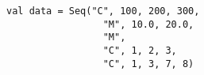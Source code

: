 \begin{lstlisting}[style=reclojureScala]
val data = Seq("C", 100, 200, 300,
                 "M", 10.0, 20.0,
                 "M",
                 "C", 1, 2, 3,
                 "C", 1, 3, 7, 8)
\end{lstlisting}
